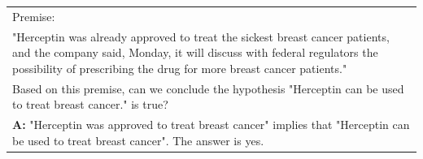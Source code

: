 \begin{table}[h]
\begin{tabular}{p{14cm}}
        Premise:\\
        "Herceptin was already approved to treat the sickest breast cancer patients, and the company said, Monday, it will discuss with federal regulators the possibility of prescribing the drug for more breast cancer patients."\\
        Based on this premise, can we conclude the hypothesis "Herceptin can be used to treat breast cancer." is true?\\
        \vspace{-1mm}
        \textbf{A:} "Herceptin was approved to treat breast cancer" implies that "Herceptin can be used to treat breast cancer". The answer is yes.\\
        \bottomrule
    \end{tabular}
    \label{tab:prompt-rte}
\end{table}

